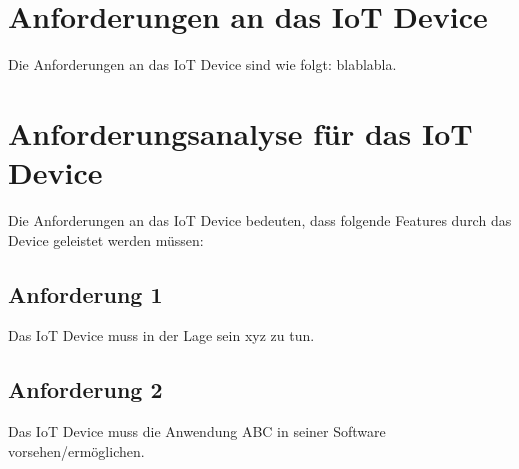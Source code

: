 \section{Anforderungen an das IoT Device}
Die Anforderungen an das IoT Device sind wie folgt: blablabla.

\section{Anforderungsanalyse für das IoT Device}
Die Anforderungen an das IoT Device bedeuten, dass folgende Features durch das Device geleistet werden müssen:
    \subsection{Anforderung 1}
    Das IoT Device muss in der Lage sein xyz zu tun.
    \subsection{Anforderung 2}
    Das IoT Device muss die Anwendung ABC in seiner Software vorsehen/ermöglichen.
